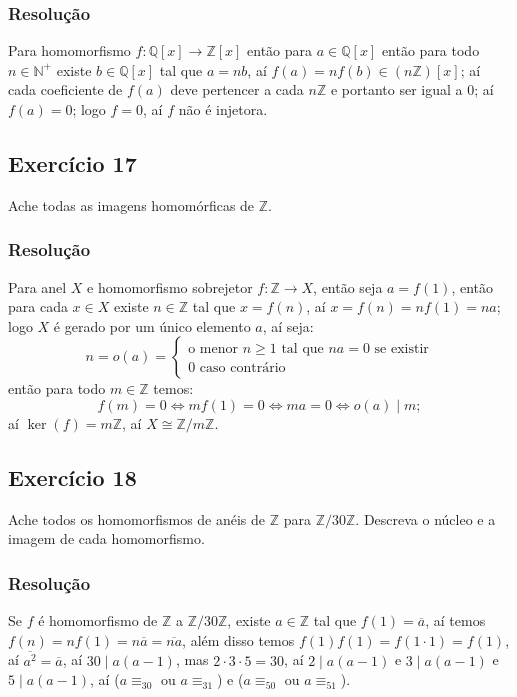 \documentclass[10pt,a4paper]{article}
\begin{document}
\subsubsection*{Resolução}

Para homomorfismo $f:\mathbb{Q}[x]\rightarrow\mathbb{Z}[x]$ então para $a\in\mathbb{Q}[x]$ então para todo $n\in\mathbb{N}^+$ existe $b\in\mathbb{Q}[x]$ tal que $a=nb$, aí $f(a)=nf(b)\in(n\mathbb{Z})[x]$; aí cada coeficiente de $f(a)$ deve pertencer a cada $n\mathbb{Z}$ e portanto ser igual a $0$; aí $f(a)=0$; logo $f=0$, aí $f$ não é injetora.

\subsection*{Exercício 17}
Ache todas as imagens homomórficas de $\mathbb{Z}$.

\subsubsection*{Resolução}

Para anel $X$ e homomorfismo sobrejetor $f:\mathbb{Z}\rightarrow X$, então seja $a=f(1)$, então para cada $x\in X$ existe $n\in\mathbb{Z}$ tal que $x=f(n)$, aí $x=f(n)=nf(1)=na$; logo $X$ é gerado por um único elemento $a$, aí seja:
\[
n=o(a)=\left\{\begin{array}{l}
\text{o menor }n\geq 1\text{ tal que }na=0\text{ se existir}\\0\text{ caso contrário}
\end{array}\right.
\]
então para todo $m\in\mathbb{Z}$ temos:
\[
f(m)=0\Leftrightarrow mf(1)=0\Leftrightarrow ma=0\Leftrightarrow o(a)\mid m;
\]
aí $\ker(f)=m\mathbb{Z}$, aí $X\cong\mathbb{Z}/m\mathbb{Z}$.

\subsection*{Exercício 18}
Ache todos os homomorfismos de anéis de $\mathbb{Z}$ para $\mathbb{Z}/30\mathbb{Z}$. Descreva o núcleo e a imagem de cada homomorfismo.

\subsubsection*{Resolução}

Se $f$ é homomorfismo de $\mathbb{Z}$ a $\mathbb{Z}/30\mathbb{Z}$, existe $a\in\mathbb{Z}$ tal que $f(1)=\overline{a}$, aí temos $f(n)=nf(1)=n\overline{a}=\overline{na}$, além disso temos $f(1)f(1)=f(1\cdot 1)=f(1)$, aí $\overline{a^2}=\overline{a}$, aí $30\mid a(a-1)$, mas $2\cdot 3\cdot5 =30$, aí $2\mid a(a-1)$ e $3\mid a(a-1)$ e $5\mid a(a-1)$, aí ($a\equiv_30$ ou $a\equiv_31$) e ($a\equiv_50$ ou $a\equiv_51$).
\end{document}
